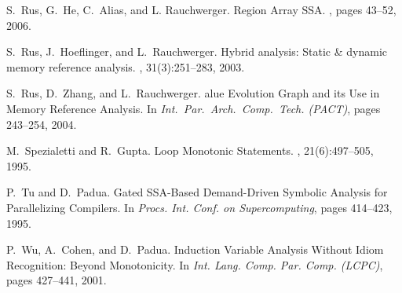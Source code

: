 \documentclass[10pt,nocopyrightspace]{sigplanconf}
\begin{document}
\begin{thebibliography}{}
S.~Rus, G.~He, C.~Alias, and L. Rauchwerger.
\newblock Region Array SSA.
, pages 43--52, 2006.

S.~Rus, J.~Hoeflinger, and L.~Rauchwerger.
\newblock Hybrid analysis: Static \& dynamic memory reference analysis.
, 31(3):251--283, 2003.

S.~Rus, D.~Zhang, and L.~Rauchwerger.
alue {E}volution {G}raph and its {U}se in {M}emory {R}eference
  {A}nalysis.
\newblock In {\em Int.~Par.~Arch.~Comp.~Tech. (PACT)}, pages 243--254, 2004.

M.~Spezialetti and R.~Gupta.
\newblock Loop {M}onotonic {S}tatements.
, 21(6):497--505, 1995.

P.~Tu and D.~Padua.
\newblock Gated {SSA}-{B}ased {D}emand-{D}riven {S}ymbolic {A}nalysis for
  {P}arallelizing {C}ompilers.
\newblock In {\em Procs. Int. Conf. on Supercomputing}, pages 414--423, 1995.

P.~Wu, A.~Cohen, and D.~Padua.
\newblock Induction {V}ariable {A}nalysis {W}ithout {I}diom {R}ecognition:
  {B}eyond {M}onotonicity.
\newblock In {\em Int. Lang. Comp. Par. Comp. (LCPC)}, pages 427--441, 2001.

\end{thebibliography}

%
\end{document}
